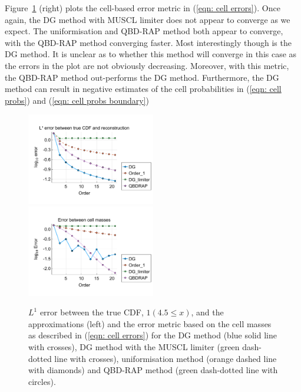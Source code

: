 \begin{example}
Figure~\ref{fig: fun 2 wave} (right) plots the cell-based error metric in (\ref{eqn: cell errors}). Once again, the DG method with MUSCL limiter does not appear to converge as we expect. The uniformisation and QBD-RAP method both appear to converge, with the QBD-RAP method converging faster. Most interestingly though is the DG method. It is unclear as to whether this method will converge in this case as the errors in the plot are not obviously decreasing. Moreover, with this metric, the QBD-RAP method out-performs the DG method. Furthermore, the DG method can result in negative estimates of the cell probabilities in (\ref{eqn: cell probs}) and (\ref{eqn: cell probs boundary})
\begin{figure}
	\centering
	\includegraphics[width=0.5\textwidth,trim={0.75cm 0.8cm 0.25cm 1.25cm},clip]{chapter6/figs/wave/fun2/meshs_l1_cdf_error_formatted.pdf}%
	\includegraphics[width=0.5\textwidth,trim={0.75cm 0.8cm 0.25cm 1.25cm},clip]{chapter6/figs/wave/fun2/L1_cell_probs.pdf}
	\caption{\(L^1\) error between the true CDF, \(1(4.5\leq x)\), and the approximations (left) and the error metric based on the cell masses as described in (\ref{eqn: cell errors}) for the DG method (blue solid line with crosses), DG method with the MUSCL limiter (green dash-dotted line with crosses), uniformisation method (orange dashed line with diamonds) and QBD-RAP method (green dash-dotted line with circles).} 
	\label{fig: fun 2 wave} 
\end{figure}
\end{example}




























